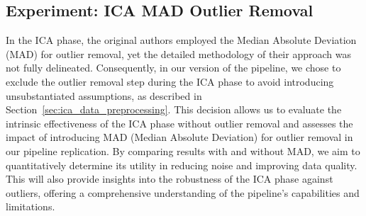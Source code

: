 \subsection{Experiment: ICA MAD Outlier Removal}\label{sec:experiment_ica_mad_outlier_removal}
In the ICA phase, the original authors employed the Median Absolute Deviation (MAD) for outlier removal, yet the detailed methodology of their approach was not fully delineated.
Consequently, in our version of the pipeline, we chose to exclude the outlier removal step during the ICA phase to avoid introducing unsubstantiated assumptions, as described in Section~\ref{sec:ica_data_preprocessing}.
This decision allows us to evaluate the intrinsic effectiveness of the ICA phase without outlier removal and assesses the impact of introducing MAD (Median Absolute Deviation) for outlier removal in our pipeline replication. 
By comparing results with and without MAD, we aim to quantitatively determine its utility in reducing noise and improving data quality. 
This will also provide insights into the robustness of the ICA phase against outliers, offering a comprehensive understanding of the pipeline's capabilities and limitations.